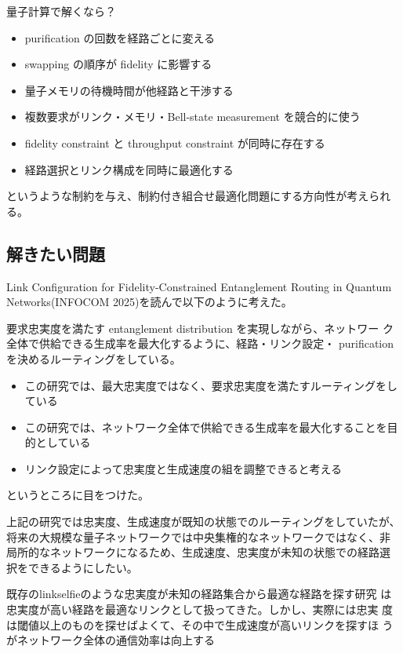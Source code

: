 \documentclass[conference]{IEEEtran}
\begin{document}
量子計算で解くなら？
\begin{itemize}
\item purification の回数を経路ごとに変える
\item swapping の順序が fidelity に影響する
\item 量子メモリの待機時間が他経路と干渉する
\item 複数要求がリンク・メモリ・Bell-state measurement を競合的に使う
\item fidelity constraint と throughput constraint が同時に存在する
\item 経路選択とリンク構成を同時に最適化する
\end{itemize}

というような制約を与え、制約付き組合せ最適化問題にする方向性が考えられ
る。



\subsection{解きたい問題}
\label{sec:orgc67e61d}

Link Configuration for Fidelity-Constrained Entanglement Routing in
Quantum Networks(INFOCOM 2025)を読んで以下のように考えた。

要求忠実度を満たす entanglement distribution を実現しながら、ネットワー
ク全体で供給できる生成率を最大化するように、経路・リンク設定・
purification を決めるルーティングをしている。

\begin{itemize}
\item この研究では、最大忠実度ではなく、要求忠実度を満たすルーティングをし
ている
\item この研究では、ネットワーク全体で供給できる生成率を最大化することを目
的としている
\item リンク設定によって忠実度と生成速度の組を調整できると考える
\end{itemize}

というところに目をつけた。

上記の研究では忠実度、生成速度が既知の状態でのルーティングをしていたが、
将来の大規模な量子ネットワークでは中央集権的なネットワークではなく、非
局所的なネットワークになるため、生成速度、忠実度が未知の状態での経路選
択をできるようにしたい。

既存のlinkselfieのような忠実度が未知の経路集合から最適な経路を探す研究
は忠実度が高い経路を最適なリンクとして扱ってきた。しかし、実際には忠実
度は閾値以上のものを探せばよくて、その中で生成速度が高いリンクを探すほ
うがネットワーク全体の通信効率は向上する
\end{document}
